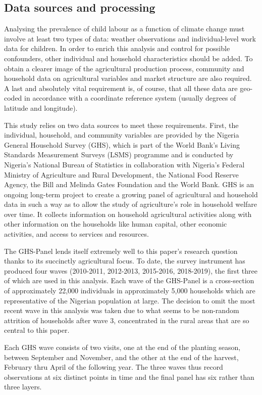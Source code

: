 \documentclass[a4paper,12pt]{article}
\theoremstyle{plain}
\theoremstyle{definition}
\theoremstyle{definition}
\theoremstyle{definition}
\theoremstyle{definition}
\begin{document}
\subsection{Data sources and processing}
\label{sub:data_sources}
Analysing the prevalence of child labour as a function of climate change must involve at least two types of data: weather observations and individual-level work data for children. In order to enrich this analysis and control for possible confounders, other individual and household characteristics should be added. To obtain a clearer image of the agricultural production process, community and household data on agricultural variables and market structure are also required. A last and absolutely vital requirement is, of course, that all these data are geo-coded in accordance with a coordinate reference system (usually degrees of latitude and longitude).

This study relies on two data sources to meet these requirements. First, the individual, household, and community variables are provided by the Nigeria General Household Survey (GHS), which is part of the World Bank's Living Standards Measurement Surveys (LSMS) programme and is conducted by Nigeria's National Bureau of Statistics in collaboration with Nigeria's Federal Ministry of Agriculture and Rural Development, the National Food Reserve Agency, the Bill and Melinda Gates Foundation and the World Bank. GHS is an ongoing long-term project to create a growing panel of agricultural and household data in such a way as to allow the study of agriculture’s role in household welfare over time. It collects information on household agricultural activities along with other information on the households like human capital, other economic activities, and access to services and resources.

The GHS-Panel lends itself extremely well to this paper's research question thanks to its succinctly agricultural focus. To date, the survey instrument has produced four waves (2010-2011, 2012-2013, 2015-2016, 2018-2019), the first three of which are used in this analysis. Each wave of the GHS-Panel is a cross-section of approximately 22,000 individuals in approximately 5,000 households which are representative of the Nigerian population at large. The decision to omit the most recent wave in this analysis was taken due to what seems to be non-random attrition of households after wave 3, concentrated in the rural areas that are so central to this paper.

Each GHS wave consists of two visits, one at the end of the planting season, between September and November, and the other at the end of the harvest, February thru April of the following year. The three waves thus record observations at six distinct points in time and the final panel has six rather than three layers.
\end{document}
